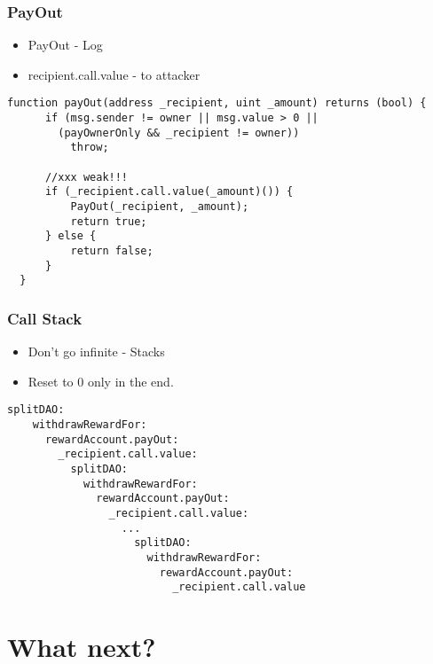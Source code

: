 \documentclass{beamer}
\begin{document}
\begin{frame}[fragile]
  \frametitle{PayOut}
  \begin{itemize}
    \item PayOut - Log
    \item \textunderscore recipient.call.value - to attacker
  \end{itemize}
  \begin{lstlisting}[language=Solidity]
    function payOut(address _recipient, uint _amount) returns (bool) {
      if (msg.sender != owner || msg.value > 0 ||
        (payOwnerOnly && _recipient != owner))
          throw;

      //xxx weak!!!
      if (_recipient.call.value(_amount)()) { 
          PayOut(_recipient, _amount);
          return true;
      } else {
          return false;
      }
  }
  \end{lstlisting}
\end{frame}

\begin{frame}[fragile]
  \frametitle{Call Stack}
  \begin{itemize}
    \item Don't go infinite - Stacks
    \item Reset to 0 only in the end.
  \end{itemize}
  \begin{lstlisting}[language=Solidity]
  splitDAO:
    withdrawRewardFor:
      rewardAccount.payOut:
        _recipient.call.value:
          splitDAO:
            withdrawRewardFor:
              rewardAccount.payOut:
                _recipient.call.value:
                  ...  
                    splitDAO:
                      withdrawRewardFor:
                        rewardAccount.payOut:
                          _recipient.call.value
  \end{lstlisting}
\end{frame}

\section{What next?}
\end{document}
